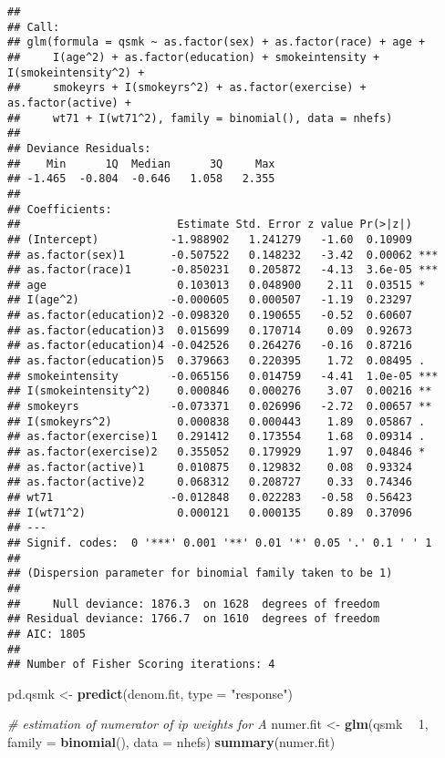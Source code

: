 \documentclass[10pt,]{book}
\newenvironment{Shaded}{\begin{snugshade}}{\end{snugshade}}
\newcommand{\CommentTok}[1]{\textcolor[rgb]{0.56,0.35,0.01}{\textit{#1}}}
\newcommand{\DataTypeTok}[1]{\textcolor[rgb]{0.13,0.29,0.53}{#1}}
\newcommand{\DecValTok}[1]{\textcolor[rgb]{0.00,0.00,0.81}{#1}}
\newcommand{\KeywordTok}[1]{\textcolor[rgb]{0.13,0.29,0.53}{\textbf{#1}}}
\newcommand{\NormalTok}[1]{#1}
\newcommand{\OperatorTok}[1]{\textcolor[rgb]{0.81,0.36,0.00}{\textbf{#1}}}
\newcommand{\StringTok}[1]{\textcolor[rgb]{0.31,0.60,0.02}{#1}}
\begin{document}
\begin{verbatim}
## 
## Call:
## glm(formula = qsmk ~ as.factor(sex) + as.factor(race) + age + 
##     I(age^2) + as.factor(education) + smokeintensity + I(smokeintensity^2) + 
##     smokeyrs + I(smokeyrs^2) + as.factor(exercise) + as.factor(active) + 
##     wt71 + I(wt71^2), family = binomial(), data = nhefs)
## 
## Deviance Residuals: 
##    Min      1Q  Median      3Q     Max  
## -1.465  -0.804  -0.646   1.058   2.355  
## 
## Coefficients:
##                        Estimate Std. Error z value Pr(>|z|)    
## (Intercept)           -1.988902   1.241279   -1.60  0.10909    
## as.factor(sex)1       -0.507522   0.148232   -3.42  0.00062 ***
## as.factor(race)1      -0.850231   0.205872   -4.13  3.6e-05 ***
## age                    0.103013   0.048900    2.11  0.03515 *  
## I(age^2)              -0.000605   0.000507   -1.19  0.23297    
## as.factor(education)2 -0.098320   0.190655   -0.52  0.60607    
## as.factor(education)3  0.015699   0.170714    0.09  0.92673    
## as.factor(education)4 -0.042526   0.264276   -0.16  0.87216    
## as.factor(education)5  0.379663   0.220395    1.72  0.08495 .  
## smokeintensity        -0.065156   0.014759   -4.41  1.0e-05 ***
## I(smokeintensity^2)    0.000846   0.000276    3.07  0.00216 ** 
## smokeyrs              -0.073371   0.026996   -2.72  0.00657 ** 
## I(smokeyrs^2)          0.000838   0.000443    1.89  0.05867 .  
## as.factor(exercise)1   0.291412   0.173554    1.68  0.09314 .  
## as.factor(exercise)2   0.355052   0.179929    1.97  0.04846 *  
## as.factor(active)1     0.010875   0.129832    0.08  0.93324    
## as.factor(active)2     0.068312   0.208727    0.33  0.74346    
## wt71                  -0.012848   0.022283   -0.58  0.56423    
## I(wt71^2)              0.000121   0.000135    0.89  0.37096    
## ---
## Signif. codes:  0 '***' 0.001 '**' 0.01 '*' 0.05 '.' 0.1 ' ' 1
## 
## (Dispersion parameter for binomial family taken to be 1)
## 
##     Null deviance: 1876.3  on 1628  degrees of freedom
## Residual deviance: 1766.7  on 1610  degrees of freedom
## AIC: 1805
## 
## Number of Fisher Scoring iterations: 4
\end{verbatim}

\begin{Shaded}
\begin{Highlighting}[]
\NormalTok{pd.qsmk <-}\StringTok{ }\KeywordTok{predict}\NormalTok{(denom.fit, }\DataTypeTok{type =} \StringTok{"response"}\NormalTok{)}

\CommentTok{# estimation of numerator of ip weights for A}
\NormalTok{numer.fit <-}\StringTok{ }\KeywordTok{glm}\NormalTok{(qsmk }\OperatorTok{~}\StringTok{ }\DecValTok{1}\NormalTok{, }\DataTypeTok{family =} \KeywordTok{binomial}\NormalTok{(), }\DataTypeTok{data =}\NormalTok{ nhefs)}
\KeywordTok{summary}\NormalTok{(numer.fit)}
\end{Highlighting}
\end{Shaded}
\end{document}
